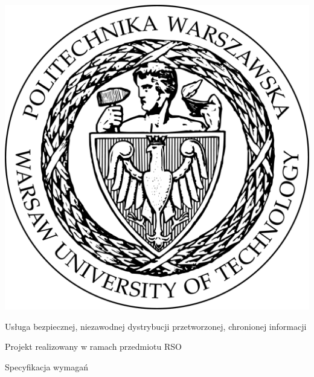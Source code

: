 \documentclass[a4paper,11pt]{article}
\author{
  Paweł Stiasny
}
\date{28 kwietnia 2016}
\begin{document}
\makeatletter
\begin{titlepage}

\begin{center}
  \includegraphics[scale=0.1]{Logo_PW_black.png} \\
  \vspace{50pt}
  
  {\LARGE Usługa bezpiecznej, niezawodnej dystrybucji przetworzonej, chronionej informacji} \\
  \vspace{10pt}
  
  {\large Projekt realizowany w ramach przedmiotu RSO} \\
  \vspace{40pt}
  
  {\Huge Specyfikacja wymagań} \\
  \vspace{30pt}
  
  {\@author} \\
  \vspace{10pt}
  
  {\@date}
\end{center}

\end{titlepage}
\makeatother

\tableofcontents
\newpage
\end{document}
